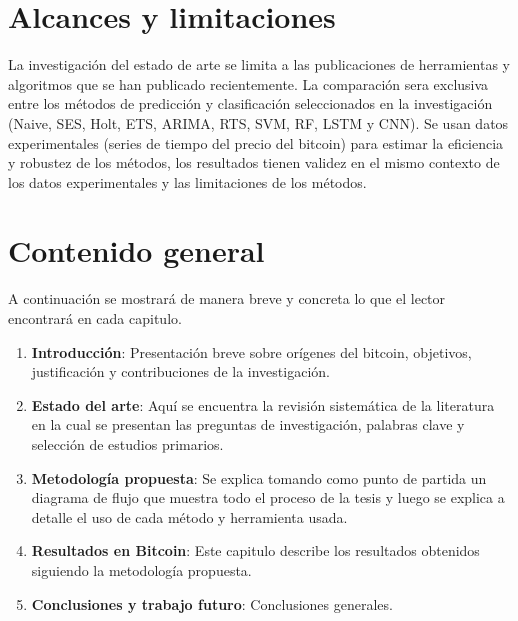 \section{Alcances y limitaciones}
La investigación del estado de arte se limita a las publicaciones de herramientas y algoritmos que se han publicado recientemente. La comparación sera exclusiva entre los métodos de predicción y clasificación seleccionados en la investigación (Naive, SES, Holt, ETS, ARIMA, RTS, SVM, RF, LSTM y CNN). Se usan datos experimentales (series de tiempo del precio del bitcoin) para estimar la eficiencia y robustez de los métodos, los resultados tienen validez en el mismo contexto de los datos experimentales y las limitaciones de los métodos.
\vspace{-0.5cm}
\section{Contenido general}
A continuación se mostrará de manera breve y concreta lo que el lector encontrará en cada capitulo.

\begin{enumerate}
	\item \textbf{Introducción}: Presentación breve sobre orígenes del bitcoin, objetivos, justificación y contribuciones de la investigación.
	
	\item \textbf{Estado del arte}: Aquí se encuentra la revisión sistemática de la literatura en la cual se presentan las preguntas de investigación, palabras clave y selección de estudios primarios.
	
	\item \textbf{Metodología propuesta}: Se explica tomando como punto de partida un diagrama de flujo que muestra todo el proceso de la tesis y luego se explica a detalle el uso de cada método y herramienta usada.
	
	\item \textbf{Resultados en Bitcoin}: Este capitulo describe los resultados obtenidos siguiendo la metodología propuesta.
	
	\item \textbf{Conclusiones y trabajo futuro}: Conclusiones generales.
\end{enumerate}


